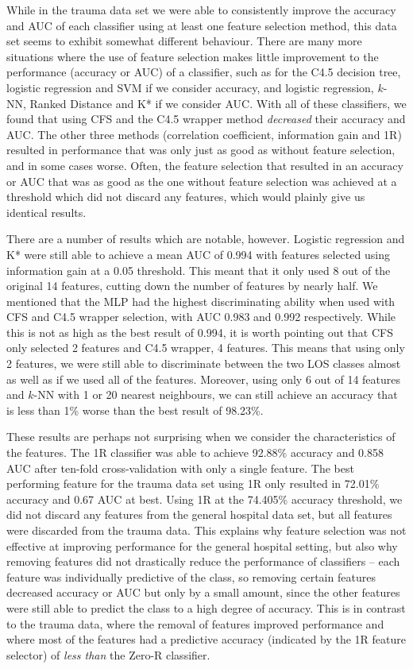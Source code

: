 While in the trauma data set we were able to consistently improve the accuracy
and AUC of each classifier using at least one feature selection method,
this data set seems to exhibit somewhat different
behaviour. There are many more situations where the use of feature selection
makes little improvement to the performance (accuracy or AUC) of a classifier,
such as for the C4.5 decision tree, logistic regression and SVM if we consider
accuracy, and logistic regression, $k$-NN, Ranked Distance and K* if we
consider AUC. With all of these classifiers, we found that using CFS and the
C4.5 wrapper method \textit{decreased} their accuracy and AUC. The other three
methods (correlation coefficient, information gain and 1R) resulted in
performance that was only just as good as without feature selection, and in
some cases worse. Often, the feature selection that resulted in an accuracy
or AUC that was as good as the one without feature selection was achieved at
a threshold which did not discard any features, which would plainly give us
identical results.

There are a number of results which are notable, however. Logistic regression
and K*
were still able to achieve a mean AUC of 0.994 with features selected using
information gain at a 0.05 threshold. This meant that it only used 8 out of
the original 14 features, cutting down the number of features by nearly half.
We mentioned that the MLP had the highest discriminating ability when used with
CFS and C4.5 wrapper selection, with AUC 0.983 and 0.992 respectively. While
this is not as high as the best result of 0.994, it is worth pointing out that
CFS only selected 2 features and C4.5 wrapper, 4 features. This means that
using only 2 features, we were still able to discriminate between the two LOS
classes almost as well as if we used all of the features. Moreover, using
only 6 out of 14 features and $k$-NN with 1 or 20 nearest neighbours, we can
still achieve an accuracy that is less than 1\% worse than the best result
of 98.23\%.

These results are perhaps not surprising when we consider the characteristics
of the features. The 1R classifier was able to achieve 92.88\% accuracy and
0.858 AUC after ten-fold cross-validation with only a single feature. The best
performing feature for the trauma data set using 1R only resulted in 72.01\%
accuracy and 0.67 AUC at best. Using 1R at the 74.405\% accuracy threshold,
we did not discard any features from the general hospital data set, but all
features were discarded from the trauma data. This explains why feature
selection was not effective at improving performance for the general hospital
setting, but also why removing features did not drastically reduce the
performance of classifiers -- each feature was individually predictive of the
class, so removing certain features decreased accuracy or AUC but only by a
small amount, since the other features were still able to predict the class
to a high degree of accuracy. This is in contrast to the trauma data, where
the removal of features improved performance and where most of the features
had a predictive accuracy (indicated by the 1R feature selector) of
\textit{less than} the Zero-R classifier.

